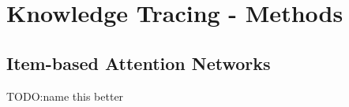 \section{Knowledge Tracing - Methods}

\subsection{Item-based Attention Networks}
TODO:name this better

